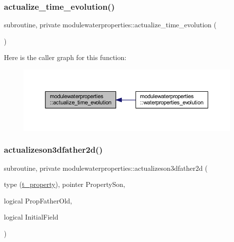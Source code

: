 \subsubsection{\texorpdfstring{actualize\+\_\+time\+\_\+evolution()}{actualize\_time\_evolution()}}
{\footnotesize\ttfamily subroutine, private modulewaterproperties\+::actualize\+\_\+time\+\_\+evolution (\begin{DoxyParamCaption}{ }\end{DoxyParamCaption})\hspace{0.3cm}{\ttfamily [private]}}

Here is the caller graph for this function\+:\nopagebreak
\begin{figure}[H]
\begin{center}
\leavevmode
\includegraphics[width=350pt]{namespacemodulewaterproperties_afcd5345e3a92fad8129c23c999e18873_icgraph}
\end{center}
\end{figure}
\mbox{\label{namespacemodulewaterproperties_ab0b8edf280ffb8e69ae400f400b252c9}} 
\subsubsection{\texorpdfstring{actualizeson3dfather2d()}{actualizeson3dfather2d()}}
{\footnotesize\ttfamily subroutine, private modulewaterproperties\+::actualizeson3dfather2d (\begin{DoxyParamCaption}\item[{type (\mbox{\hyperlink{structmodulewaterproperties_1_1t__property}{t\+\_\+property}}), pointer}]{Property\+Son,  }\item[{logical}]{Prop\+Father\+Old,  }\item[{logical}]{Initial\+Field }\end{DoxyParamCaption})\hspace{0.3cm}{\ttfamily [private]}}

